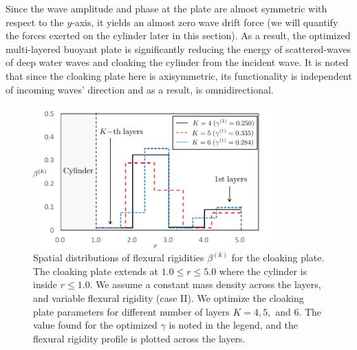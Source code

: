 \documentclass{jfm}
\begin{document}
Since the wave amplitude and phase at the plate are almost symmetric with respect to the $y$-axis, it yields an almost zero wave drift force (we will quantify the forces exerted on the cylinder later in this section). As a result, the optimized multi-layered buoyant plate is significantly reducing the energy of scattered-waves of deep water waves and cloaking the cylinder from the incident wave. It is noted that since the cloaking plate here is 
axisymmetric, its functionality is independent of incoming waves' direction and as a result, is omnidirectional.



\begin{figure}
 \centering
 \includegraphics[width=3.6in]{fig/fig4.png}
 \caption{Spatial distributions of flexural rigidities $\beta^{(k)}$ for the cloaking plate. The cloaking plate extends at $1.0\le r\le 5.0$ where the cylinder is inside $r\leq 1.0$. We assume a constant mass density across the layers, and variable flexural rigidity (case II). We optimize the cloaking plate parameters for different number of layers  $K=4,5,$ and $6$. The value found for the optimized $\gamma$ is noted in the legend, and the flexural rigidity profile is plotted across the layers.}
 \label{fig4}
\end{figure}
\end{document}

